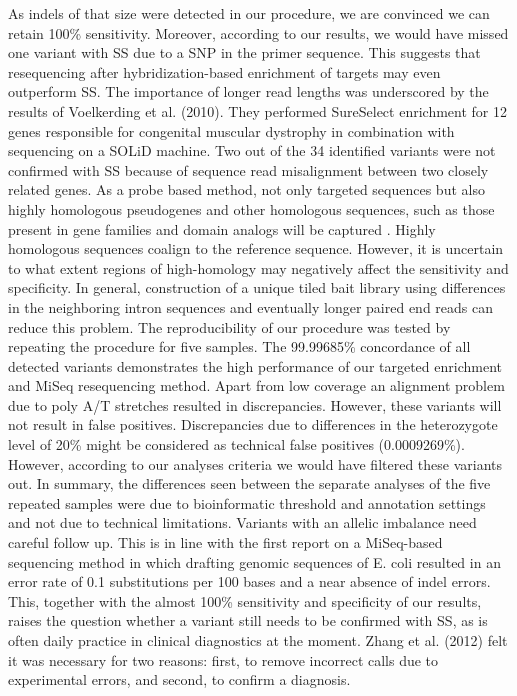 As indels of that size were detected in our procedure, we are convinced we can retain 100\% sensitivity. 
Moreover, according to our results, we would have missed one variant with SS due to a SNP in the primer sequence. 
This suggests that resequencing after hybridization-based enrichment of targets may even outperform SS. 
The importance of longer read lengths was underscored by the results of Voelkerding et al. (2010)\cite{Voelkerding_2010}. 
They performed SureSelect enrichment for 12 genes responsible for congenital muscular dystrophy in combination with sequencing on a SOLiD machine. 
Two out of the 34 identified variants were not confirmed with SS because of sequence read misalignment between two closely related genes. 
As a probe based method, not only targeted sequences but also highly homologous pseudogenes and other homologous sequences, such as those present in gene families and domain analogs will be captured \cite{Coonrod_2012}. 
Highly homologous sequences coalign to the reference sequence. 
However, it is uncertain to what extent regions of high-homology may negatively affect the sensitivity and specificity. 
In general, construction of a unique tiled bait library using differences in the neighboring intron sequences and eventually longer paired end reads can reduce this problem. 
The reproducibility of our procedure was tested by repeating the procedure for five samples. 
The 99.99685\% concordance of all detected variants demonstrates the high performance of our targeted enrichment and MiSeq resequencing method. 
Apart from low coverage an alignment problem due to poly A/T stretches resulted in discrepancies. 
However, these variants will not result in false positives. 
Discrepancies due to differences in the heterozygote level of 20\% might be considered as technical false positives (0.0009269\%). 
However, according to our analyses criteria we would have filtered these variants out. 
In summary, the differences seen between the separate analyses of the five repeated samples were due to bioinformatic threshold and annotation settings and not due to technical limitations. 
Variants with an allelic imbalance need careful follow up. 
This is in line with the first report on a MiSeq-based sequencing method in which drafting genomic sequences of E. coli resulted in an error rate of 0.1 substitutions per 100 bases and a near absence of indel errors\cite{Loman_2012}. 
This, together with the almost 100\% sensitivity and specificity of our results, raises the question whether a variant still needs to be confirmed with SS, as is often daily practice in clinical diagnostics at the moment. Zhang et al. (2012)\cite{Zhang_2012} felt it was necessary for two reasons: first, to remove incorrect calls due to experimental errors, and second, to confirm a diagnosis. 
